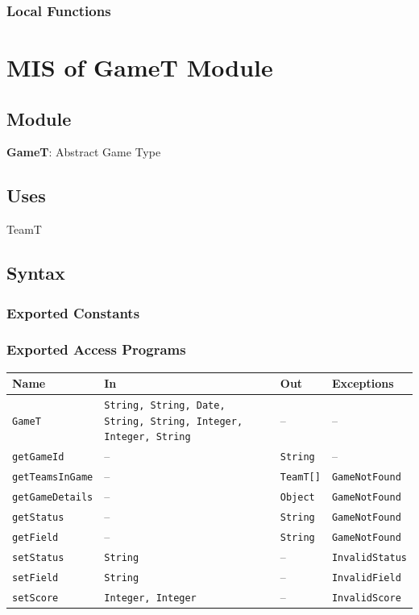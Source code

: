 \documentclass[12pt, titlepage]{article}
\begin{document}
\subsubsection{Local Functions}

\newpage

\section{MIS of GameT Module} \label{GameTModule}

\subsection{Module}
\textbf{GameT}: Abstract Game Type

\subsection{Uses}
TeamT

\subsection{Syntax}

\subsubsection{Exported Constants}

\subsubsection{Exported Access Programs}
\begin{center}
  \begin{tabularx}{\textwidth}{@{}lXlX@{}}
  \toprule
  \textbf{Name} & \textbf{In} & \textbf{Out} & \textbf{Exceptions} \\
  \midrule
  \texttt{GameT} & \texttt{String, String, Date, String, String, Integer, Integer, String} & -- & -- \\
  \texttt{getGameId} & -- & \texttt{String} & -- \\
  \texttt{getTeamsInGame} & -- & \texttt{TeamT[]} & \texttt{GameNotFound} \\
  \texttt{getGameDetails} & -- & \texttt{Object} & \texttt{GameNotFound} \\
  \texttt{getStatus} & -- & \texttt{String} & \texttt{GameNotFound} \\
  \texttt{getField} & -- & \texttt{String} & \texttt{GameNotFound} \\
  \texttt{setStatus} & \texttt{String} & -- & \texttt{InvalidStatus} \\
  \texttt{setField} & \texttt{String} & -- & \texttt{InvalidField} \\
  \texttt{setScore} & \texttt{Integer, Integer} & -- & \texttt{InvalidScore} \\
  \bottomrule
  \end{tabularx}
  \end{center}
\end{document}
